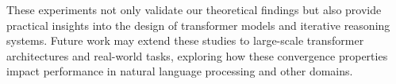 These experiments not only validate our theoretical findings but also provide practical insights into the design of transformer models and iterative reasoning systems. Future work may extend these studies to large-scale transformer architectures and real-world tasks, exploring how these convergence properties impact performance in natural language processing and other domains.
